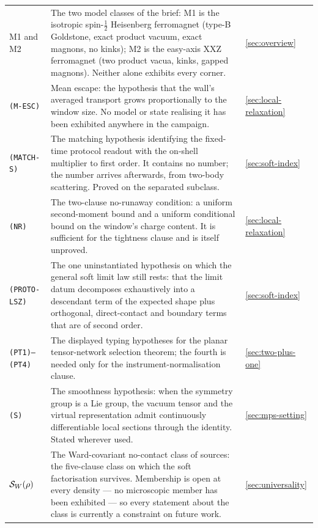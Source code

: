 {\begin{longtable}{@{}p{}p{}p{}@{}}
M1 and M2 & The two model classes of the brief: M1 is the isotropic
spin-$\tfrac12$ Heisenberg ferromagnet (type-B Goldstone, exact product
vacuum, exact magnons, no kinks); M2 is the easy-axis XXZ ferromagnet (two
product vacua, kinks, gapped magnons). Neither alone exhibits every corner. & \cref{sec:overview}\\

\texttt{(M-ESC)} & Mean escape: the hypothesis that the wall's averaged
transport grows proportionally to the window size. No model or state realising
it has been exhibited anywhere in the campaign. & \cref{sec:local-relaxation}\\

\texttt{(MATCH-S)} & The matching hypothesis identifying the fixed-time
protocol readout with the on-shell multiplier to first order. It contains no
number; the number arrives afterwards, from two-body scattering. Proved on the
separated subclass. & \cref{sec:soft-index}\\

\texttt{(NR)} & The two-clause no-runaway condition: a uniform second-moment
bound and a uniform conditional bound on the window's charge content. It is
sufficient for the tightness clause and is itself unproved. & \cref{sec:local-relaxation}\\

\texttt{(PROTO-LSZ)} & The one uninstantiated hypothesis on which the general
soft limit law still rests: that the limit datum decomposes exhaustively into
a descendant term of the expected shape plus orthogonal, direct-contact and
boundary terms that are of second order. & \cref{sec:soft-index}\\

\texttt{(PT1)--(PT4)} & The displayed typing hypotheses for the planar
tensor-network selection theorem; the fourth is needed only for the
instrument-normalisation clause. & \cref{sec:two-plus-one}\\

\texttt{(S)} & The smoothness hypothesis: when the symmetry group is a Lie
group, the vacuum tensor and the virtual representation admit continuously
differentiable local sections through the identity. Stated wherever used. & \cref{sec:mps-setting}\\

$\mathcal{S}_W(\rho)$ & The Ward-covariant no-contact class of sources: the
five-clause class on which the soft factorisation survives. Membership is open
at every density --- no microscopic member has been exhibited --- so every
statement about the class is currently a constraint on future work. & \cref{sec:universality}\\


\end{longtable}}
